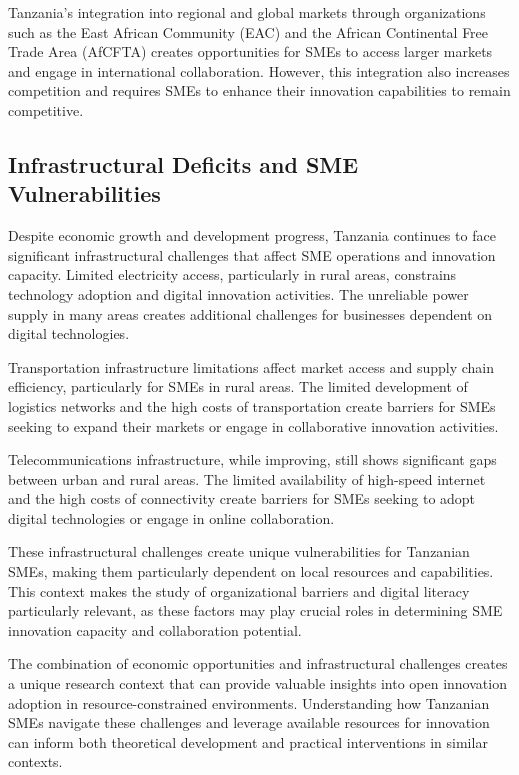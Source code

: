 \documentclass[12pt,a4paper]{article}
\begin{document}
Tanzania's integration into regional and global markets through organizations such as the East African Community (EAC) and the African Continental Free Trade Area (AfCFTA) creates opportunities for SMEs to access larger markets and engage in international collaboration. However, this integration also increases competition and requires SMEs to enhance their innovation capabilities to remain competitive.

\subsection{Infrastructural Deficits and SME Vulnerabilities}

Despite economic growth and development progress, Tanzania continues to face significant infrastructural challenges that affect SME operations and innovation capacity. Limited electricity access, particularly in rural areas, constrains technology adoption and digital innovation activities. The unreliable power supply in many areas creates additional challenges for businesses dependent on digital technologies.

Transportation infrastructure limitations affect market access and supply chain efficiency, particularly for SMEs in rural areas. The limited development of logistics networks and the high costs of transportation create barriers for SMEs seeking to expand their markets or engage in collaborative innovation activities.

Telecommunications infrastructure, while improving, still shows significant gaps between urban and rural areas. The limited availability of high-speed internet and the high costs of connectivity create barriers for SMEs seeking to adopt digital technologies or engage in online collaboration.

These infrastructural challenges create unique vulnerabilities for Tanzanian SMEs, making them particularly dependent on local resources and capabilities. This context makes the study of organizational barriers and digital literacy particularly relevant, as these factors may play crucial roles in determining SME innovation capacity and collaboration potential.

The combination of economic opportunities and infrastructural challenges creates a unique research context that can provide valuable insights into open innovation adoption in resource-constrained environments. Understanding how Tanzanian SMEs navigate these challenges and leverage available resources for innovation can inform both theoretical development and practical interventions in similar contexts.
\end{document}
